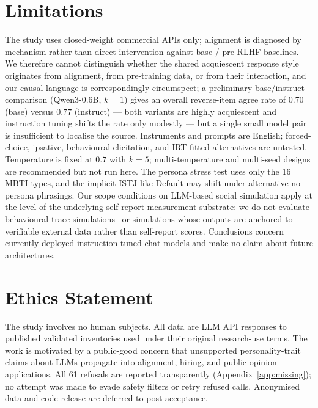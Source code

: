 \documentclass{article}
\begin{document}
\section*{Limitations}
\label{sec:limitations}

The study uses closed-weight commercial APIs only; alignment is diagnosed by mechanism rather than direct intervention against base / pre-RLHF baselines. We therefore cannot distinguish whether the shared acquiescent response style originates from alignment, from pre-training data, or from their interaction, and our causal language is correspondingly circumspect; a preliminary base/instruct comparison (Qwen3-0.6B, $k{=}1$) gives an overall reverse-item agree rate of $0.70$ (base) versus $0.77$ (instruct) --- both variants are highly acquiescent and instruction tuning shifts the rate only modestly --- but a single small model pair is insufficient to localise the source. Instruments and prompts are English; forced-choice, ipsative, behavioural-elicitation, and IRT-fitted alternatives are untested. Temperature is fixed at $0.7$ with $k{=}5$; multi-temperature and multi-seed designs are recommended but not run here. The persona stress test uses only the 16 MBTI types, and the implicit ISTJ-like Default may shift under alternative no-persona phrasings. Our scope conditions on LLM-based social simulation apply at the level of the underlying self-report measurement substrate: we do not evaluate behavioural-trace simulations~\citep{park2023generative} or simulations whose outputs are anchored to verifiable external data rather than self-report scores. Conclusions concern currently deployed instruction-tuned chat models and make no claim about future architectures.


\section*{Ethics Statement}
\label{sec:ethics}

The study involves no human subjects. All data are LLM API responses to published validated inventories used under their original research-use terms. The work is motivated by a public-good concern that unsupported personality-trait claims about LLMs propagate into alignment, hiring, and public-opinion applications. All 61 refusals are reported transparently (Appendix~\ref{app:missing}); no attempt was made to evade safety filters or retry refused calls. Anonymised data and code release are deferred to post-acceptance.
\end{document}
